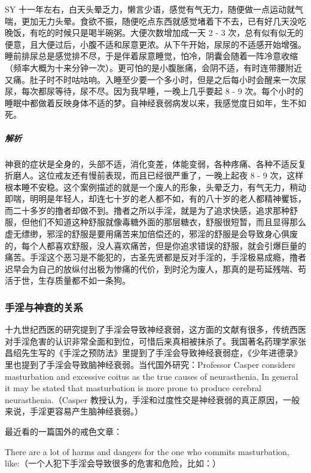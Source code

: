 \begin{case}[神经衰弱]
    SY 十一年左右，白天头晕乏力，懒言少语，感觉有气无力，随便做一点运动就气喘，更加无力头晕。食欲不振，随便吃点东西就感觉堵着下不去，已有好几天没吃晚饭，有吃的时候只是喝半碗粥。大便次数增加成一天 2 - 3 次，总有似有似无的便意，且大便过后，小腹不适和尿意更浓。从下午开始，尿尿的不适感开始增强。睡前排尿总是感觉排不尽，于是伴着尿意睡觉，怕冷，阴囊会随着一阵冷意收缩（频率大概为十来分钟一次）。更可怕的是小腹胀痛，会阴不适，有时连带腰附近又痛。肚子时不时咕咕响。入睡至少要一个多小时，但是之后每小时会醒来一次尿尿，每次都尿等待，尿不尽。因为我早睡，一晚上几乎要起 8 - 9 次。每个小时的睡眠中都做着反映身体不适的梦。自神经衰弱病发以来，我感觉度日如年，生不如死。
    \subparagraph{解析} 神衰的症状是全身的，头部不适，消化变差，体能变弱，各种疼痛、各种不适反复折磨人。这位戒友还有慢前表现，而且已经很严重了，一晚上起夜 8 - 9 次，这样根本睡不安稳。这个案例描述的就是一个废人的形象，头晕乏力，有气无力，稍动即喘，明明是年轻人，却连七十岁的老人都不如，有的八十岁的老人都精神矍铄，而二十多岁的撸者却做不到。撸者之所以手淫，就是为了追求快感，追求那种舒服，但他们不知道这种舒服就像毒糖外面的那层糖衣，舒服很短暂，而且显得那么虚无缥缈，邪淫的舒服是要用痛苦来加倍偿还的，邪淫的舒服是会导致身心俱废的，每个人都喜欢舒服，没人喜欢痛苦，但是你追求错误的舒服，就会引爆巨量的痛苦。手淫这个恶习是不能犯的，古圣先贤都是反对手淫的，手淫极易成瘾，撸者迟早会为自己的放纵付出极为惨痛的代价，到时沦为废人，那真的是苟延残喘、苟活于世，生存质量都不如一条狗。
\end{case}

\subsubsection{手淫与神衰的关系}

十九世纪西医的研究提到了手淫会导致神经衰弱，这方面的文献有很多，传统西医对手淫危害的认识非常全面和到位，可惜后来真相被抹杀了。我国著名药理学家张昌绍先生写的《手淫之预防法》里提到了手淫会导致神经衰弱症，《少年进德录》里也提到了手淫会导致脑神经衰弱。当代国外研究：Professor Casper considers masturbation and excessive coitus as the true causes of neurasthenia, In general it may be stated that masturbation is more prone to produce cerebral neurasthenia.（Casper 教授认为，手淫和过度性交是神经衰弱的真正原因，一般来说，手淫更容易产生脑神经衰弱。）

最近看的一篇国外的戒色文章：

There are a lot of harms and dangers for the one who commits masturbation, like:（一个人犯下手淫会导致很多的危害和危险，比如：）

